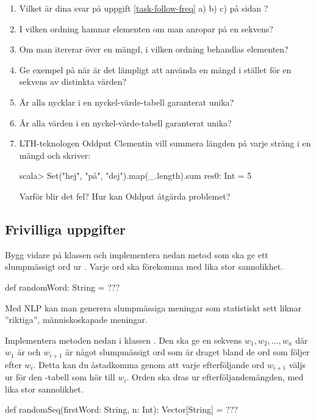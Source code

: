 \begin{enumerate}

\item Vilket är dina svar på uppgift \ref{task-follow-freq} a) b) c) på sidan \pageref{task-follow-freq}?

\item I vilken ordning hamnar elementen om man anropar  på en sekvens?

\item Om man itererar över en mängd, i vilken ordning behandlas elementen?

\item Ge exempel på när är det lämpligt att använda en mängd i stället för en sekvens av distinkta värden?

\item Är alla nycklar i en nyckel-värde-tabell garanterat unika?

\item Är alla värden i en nyckel-värde-tabell garanterat unika?

\item LTH-teknologen Oddput Clementin vill summera längden på varje sträng i en mängd och skriver:
\begin{REPL}
scala> Set("hej", "på", "dej").map(_.length).sum
res0: Int = 5
\end{REPL}
Varför blir det fel? Hur kan Oddput åtgärda problemet?
\end{enumerate}

\subsection{Frivilliga uppgifter}

\Task Bygg vidare på klassen  och implementera nedan metod som ska ge ett slumpmässigt ord ur . Varje ord ska förekomma med lika stor sannolikhet.
\begin{Code}
def randomWord: String = ???
\end{Code}

\Task \label{task:words:randomSeq} Med NLP kan man generera slumpmässiga meningar som statistiskt sett liknar ''riktiga'', människoskapade meningar.

Implementera metoden  nedan i klassen . Den ska ge en sekvens $w_{1}, w_{2}, ..., w_{n}$  där $w_{1}$ är  och $w_{i+1}$ är något slumpmässigt ord som är draget bland de ord som följer efter $w_{i}$. Detta kan du åstadkomma genom att varje efterföljande ord $w_{i+1}$ väljs ur  för den -tabell som hör till $w_{i}$. Orden ska dras ur efterföljandemängden, med lika stor sannolikhet.
\begin{Code}
def randomSeq(firstWord: String, n: Int): Vector[String] = ???
\end{Code}

